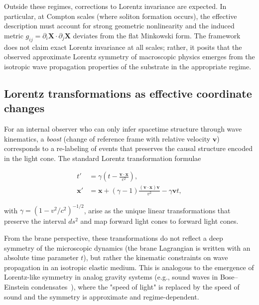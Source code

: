 Outside these regimes, corrections to Lorentz invariance are expected. In
particular, at Compton scales (where soliton formation occurs), the effective
description must account for strong geometric nonlinearity and the induced
metric $g_{ij} = \partial_i \mathbf{X} \cdot \partial_j \mathbf{X}$ deviates
from the flat Minkowski form. The framework does not claim exact Lorentz
invariance at all scales; rather, it posits that the observed approximate
Lorentz symmetry of macroscopic physics emerges from the isotropic wave
propagation properties of the substrate in the appropriate regime.

\subsection{Lorentz transformations as effective coordinate changes}

For an internal observer who can only infer spacetime structure through wave
kinematics, a \emph{boost} (change of reference frame with relative velocity
$\mathbf{v}$) corresponds to a re-labeling of events that preserves the causal
structure encoded in the light cone. The standard Lorentz transformation
formulae

\begin{align}
t' &= \gamma \left( t - \frac{\mathbf{v} \cdot \mathbf{x}}{c^2} \right), \\
\mathbf{x}' &= \mathbf{x} + (\gamma - 1) \frac{(\mathbf{v} \cdot \mathbf{x})
\mathbf{v}}{v^2} - \gamma \mathbf{v} t,
\end{align}

with $\gamma = (1 - v^2/c^2)^{-1/2}$, arise as the unique linear transformations
that preserve the interval $ds^2$ and map forward light cones to forward light
cones.

From the brane perspective, these transformations do not reflect a deep symmetry
of the microscopic dynamics (the brane Lagrangian is written with an absolute
time parameter $t$), but rather the kinematic constraints on wave propagation in
an isotropic elastic medium. This is analogous to the emergence of Lorentz-like
symmetry in analog gravity systems (e.g., sound waves in Bose--Einstein
condensates~\cite{Barcelo2011AnalogueGravity}), where the "speed of light" is
replaced by the speed of sound and the symmetry is approximate and regime-dependent.